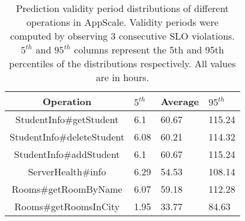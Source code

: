 \begin{table}
\caption{Prediction validity period distributions of different operations in
AppScale. Validity periods were computed by observing $3$ consecutive SLO
violations. $5^{th}$ and $95^{th}$ 
columns represent the 5th and 95th percentiles of the
distributions respectively. All values are in hours.
\label{tab:as_validity}
}
\begin{center}
\begin{tabular}{|c|p{2cm}|p{2cm}|p{2cm}|}
\hline
Operation & $5^{th}$ & Average & $95^{th}$ \\ \hline
StudentInfo\#getStudent & 6.1 & 60.67 & 115.24 \\ \hline
StudentInfo\#deleteStudent & 6.08 & 60.21 & 114.32 \\ \hline
StudentInfo\#addStudent & 6.1 & 60.67 & 115.24 \\ \hline
ServerHealth\#info & 6.29 & 54.53 & 108.14 \\ \hline
Rooms\#getRoomByName & 6.07 & 59.18 & 112.28 \\ \hline
Rooms\#getRoomsInCity & 1.95 & 33.77 & 84.63 \\ \hline
\end{tabular}
\end{center}
\end{table}



